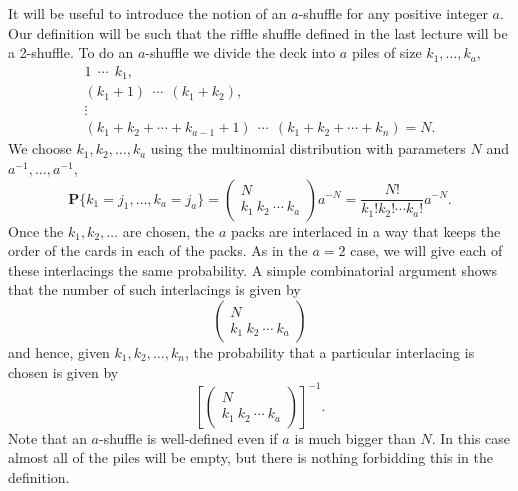 \documentclass{stml-l}
\theoremstyle{definition}
\numberwithin{equation}{chapter}
\numberwithin{figure}{chapter}
\numberwithin{figure}{section}
\begin{document}
It will be useful to introduce the notion of an $a$-shuffle for any
positive integer $a$. Our definition will be such that the riffle
shuffle defined in the last lecture will be a 2-shuffle. To do an
$a$-shuffle we divide the deck into $a$ piles of size
$k_{1},\ldots,k_{a}$,
\begin{gather*}
1\ \ \cdots\ \ k_{1},\\
(k_{1}+1)\ \ \cdots\ \ (k_{1}+k_{2}),\\
\vdots\\
(k_{1}+k_{2}+\cdots+k_{a-1}+1)\ \ \cdots\ \
(k_{1}+k_{2}+\cdots+k_{n})=N.
\end{gather*}
We choose $k_{1},k_{2},\ldots,k_{a}$ using the multinomial
distribution with parameters $N$ and $a^{-1},\ldots,a^{-1}$,
\begin{equation*}
\mathbf{P}\{k_{1}=j_{1},\ldots,k_{a}=j_{a}\}=\left(\begin{matrix}
N \\
k_{1}\ k_{2}\ \cdots\ k_{a}
\end{matrix}\right) a^{-N}=\frac{N!}{k_{1}!k_{2}!\cdots k_{a}!}a^{-N}.
\end{equation*}
Once the $k_{1},k_{2},\ldots$ are chosen, the $a$ packs are
interlaced in a way that keeps the order of the cards in each of the
packs. As in the $a=2$ case, we will give each of these interlacings
the same probability. A simple combinatorial argument shows that the
number of such interlacings is given by
\begin{equation*}
\left(\begin{matrix}
N\\
k_{1}\ k_{2}\ \cdots\ k_{a}
\end{matrix}\right)
\end{equation*}
and hence, given $k_{1},k_{2},\ldots,k_{n}$, the probability that a
particular interlacing is chosen is given by
\begin{equation*}
\left[\left(\begin{matrix} N \\
k_{1}\ k_{2}\ \cdots\ k_{a}
\end{matrix}\right)\right]^{-1}.
\end{equation*}
Note that an $a$-shuffle is well-defined even if $a$ is much bigger
than $N$. In this case almost all of the piles will be empty, but
there is nothing forbidding this in the definition.
\end{document}
